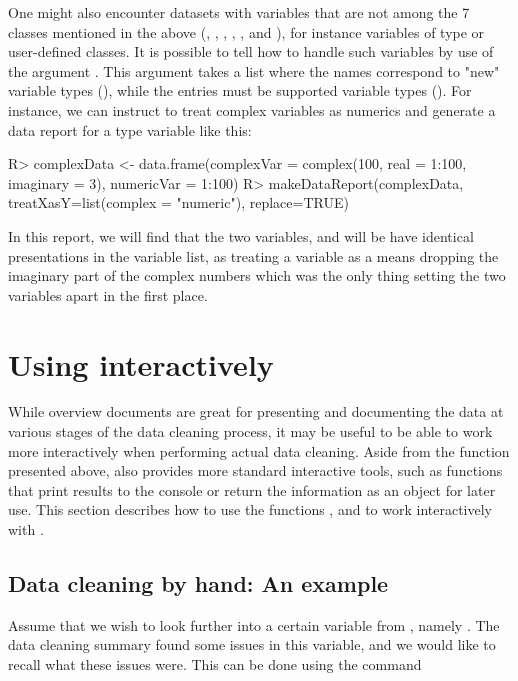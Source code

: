 \documentclass[article,shortnames]{jss}
\begin{document}
One might also encounter datasets with variables that are not among the 7 classes mentioned in the above (, , , , ,  and ), for instance variables of type  or user-defined classes. It is possible to tell  how to handle such variables by use of the argument . This argument takes a list where the names correspond to "new" variable types (), while the entries must be supported variable types (). For instance, we can instruct  to treat complex variables as numerics and generate a data report for a type  variable like this:

\begin{Schunk}
\begin{Sinput}
R> complexData <- data.frame(complexVar = complex(100, real = 1:100, imaginary = 3), numericVar = 1:100)
R> makeDataReport(complexData, treatXasY=list(complex = "numeric"), replace=TRUE)
\end{Sinput}
\end{Schunk}

In this report, we will find that the two variables,  and  will be have identical presentations in the variable list, as treating a  variable as a  means dropping the imaginary part of the complex numbers which was the only thing setting the two variables apart in the first place.  


\section[Using dataMaid interactively]{Using  interactively}
\label{sec:interactiveCleanR}

While overview documents are great for presenting and documenting the data at various stages 
of the data cleaning process, it may be useful to be able to work more
interactively when performing actual data cleaning. Aside from
the  function presented above,  also
provides more standard  interactive tools, such as
functions that print results to the console or return the information
as an object for later use. This section describes how to use the
functions ,  and  to
work interactively with .

\subsection{Data cleaning by hand: An example}
Assume that we wish to look further into a certain variable from
, namely . The data cleaning summary found some
issues in this variable, and we would like to recall what these issues
were. This can be done using the  command
\end{document}
